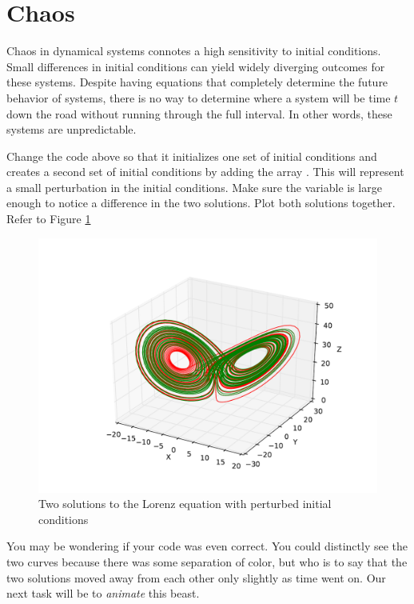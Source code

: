 \section*{Chaos}

Chaos in dynamical systems connotes a high sensitivity to initial conditions.
Small differences in initial conditions can yield widely diverging outcomes for these systems.
Despite having equations that completely determine the future behavior of systems, there is no way to determine where a system will be time $t$ down the road without running through the full interval.
In other words, these systems are unpredictable.

\begin{problem}
Change the code above so that it initializes one set of initial conditions and creates a second set of initial conditions by adding the array .
This will represent a small perturbation in the initial conditions. Make sure the  variable is large enough to notice a difference in the two solutions.
Plot both solutions together.
Refer to Figure \ref{fig:perturbed_lorenz}
\end{problem}

\begin{figure}
\includegraphics[width=\textwidth]{figures/perturbed_lorenz.pdf}
\caption{Two solutions to the Lorenz equation with perturbed initial conditions}
\label{fig:perturbed_lorenz}
\end{figure}

You may be wondering if your code was even correct.
You could distinctly see the two curves because there was some separation of color, but who is to say that the two solutions moved away from each other only slightly as time went on.
Our next task will be to \textit{animate} this beast.

